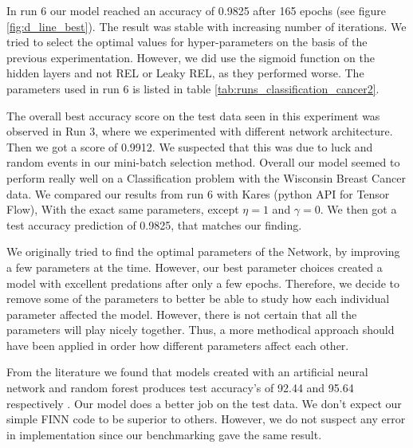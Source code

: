 
In run 6 our model reached an accuracy of 0.9825 after 165 epochs (see figure
\ref{fig:d_line_best}). The result was stable
with increasing number of iterations. We tried to select the optimal values for
hyper-parameters on the basis of the previous experimentation. However, we did
use the sigmoid function on the hidden layers and not REL or Leaky REL, as
they performed worse. The parameters used in run 6 is listed in table
\ref{tab:runs_classification_cancer2}. 

The overall best accuracy score on the test data seen in this experiment was observed in Run
3, where we experimented with different network architecture. Then we got a
score of 0.9912. We suspected that this was due to luck and random events in
our mini-batch selection method. 
Overall our model seemed to perform really well on a Classification problem
with the Wisconsin Breast Cancer data. We compared our results from run 6 with Kares
(python API for Tensor Flow), With the exact same parameters, except $\eta =
1$ and $\gamma = 0$. We then got a test accuracy prediction of 0.9825, that
matches our finding. 


We originally tried to find the optimal parameters of the Network, by improving
a few parameters at the time. However, our best parameter choices created a
model with excellent predations after only a few epochs. Therefore, we decide
to remove some of the parameters to better be able to study how each individual
parameter affected the model. However, there is not certain that all the
parameters will play nicely together. Thus, a more methodical approach should
have been applied in order how different parameters affect each other.     


From the literature we found
that models created with an artificial neural network and random forest
produces test accuracy's of 92.44 and 95.64 respectively \cite{Vig2014ComparativeAO}. Our model does a
better job on the test data. We don't expect our simple FINN code to be
superior to others. However, we do not suspect any error in implementation
since our benchmarking gave the same result.   


